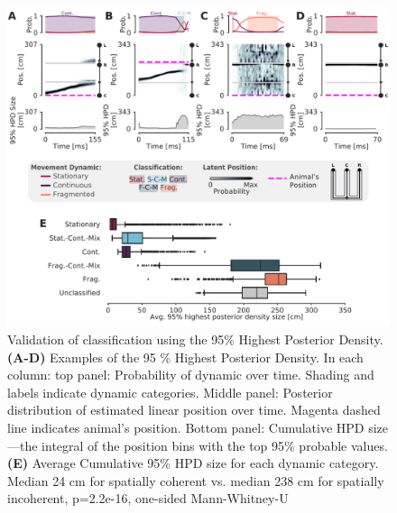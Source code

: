 \documentclass[times, twoside]{zHenriquesLab-StyleBioRxiv}
\begin{document}
\begin{figure}%
\centering
\includegraphics[width=0.80\linewidth]{figures/Figure4/Figure4_v6}
\caption{Validation of classification using the 95\% Highest Posterior Density. \textbf{(A-D)}  Examples of the 95 \% Highest Posterior Density. In each column: top panel: Probability of dynamic over time. Shading and labels indicate dynamic categories. Middle panel: Posterior distribution of estimated linear position over time. Magenta dashed line indicates animal's position. Bottom panel: Cumulative HPD size---the integral of the position bins with the top 95\% probable values. \textbf{(E)} Average Cumulative 95\% HPD size for each dynamic category. Median 24 cm for spatially coherent vs. median 238 cm for spatially incoherent, p=2.2e-16, one-sided Mann-Whitney-U}
\label{4}
\end{figure}
\end{document}
